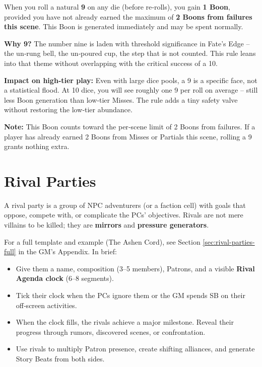 \begin{tcolorbox}[colback=green!5!white, colframe=green!75!black, title=🎲 The Nine’s Boon (Optional), fonttitle=\bfseries]
  When you roll a natural \textbf{9} on any die (before re‑rolls), you gain \textbf{1 Boon}, provided you have not already earned the maximum of \textbf{2 Boons from failures this scene}. This Boon is generated immediately and may be spent normally.

  \medskip
  \noindent\textbf{Why 9?} The number nine is laden with threshold significance in Fate’s Edge – the un‑rung bell, the un‑poured cup, the step that is not counted. This rule leans into that theme without overlapping with the critical success of a 10.

  \medskip
  \noindent\textbf{Impact on high‑tier play:} Even with large dice pools, a 9 is a specific face, not a statistical flood. At 10 dice, you will see roughly one 9 per roll on average – still less Boon generation than low‑tier Misses. The rule adds a tiny safety valve without restoring the low‑tier abundance.

  \medskip
  \noindent\textbf{Note:} This Boon counts toward the per‑scene limit of 2 Boons from failures. If a player has already earned 2 Boons from Misses or Partials this scene, rolling a 9 grants nothing extra.
\end{tcolorbox}

\section{Rival Parties}
\label{sec:rival-parties}

A rival party is a group of NPC adventurers (or a faction cell) with goals that oppose, compete with, or complicate the PCs’ objectives. Rivals are not mere villains to be killed; they are \textbf{mirrors} and \textbf{pressure generators}.

For a full template and example (The Ashen Cord), see Section \ref{sec:rival-parties-full} in the GM’s Appendix. In brief:
\begin{itemize}
  \item Give them a name, composition (3–5 members), Patrons, and a visible \textbf{Rival Agenda clock} (6–8 segments).
  \item Tick their clock when the PCs ignore them or the GM spends SB on their off‑screen activities.
  \item When the clock fills, the rivals achieve a major milestone. Reveal their progress through rumors, discovered scenes, or confrontation.
  \item Use rivals to multiply Patron presence, create shifting alliances, and generate Story Beats from both sides.
\end{itemize}

